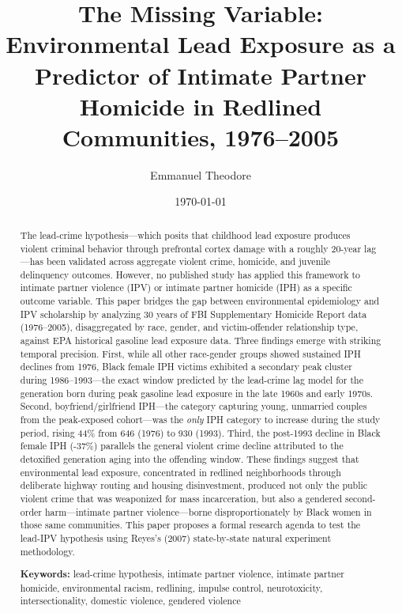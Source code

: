 \documentclass[12pt, letterpaper]{article}
\title{\textbf{The Missing Variable: Environmental Lead Exposure as a Predictor of Intimate Partner Homicide in Redlined Communities, 1976--2005}}
\author{Emmanuel Theodore}
\date{\today}
\begin{document}
\maketitle

\begin{abstract}
The lead-crime hypothesis---which posits that childhood lead exposure produces violent criminal behavior through prefrontal cortex damage with a roughly 20-year lag---has been validated across aggregate violent crime, homicide, and juvenile delinquency outcomes. However, no published study has applied this framework to intimate partner violence (IPV) or intimate partner homicide (IPH) as a specific outcome variable. This paper bridges the gap between environmental epidemiology and IPV scholarship by analyzing 30 years of FBI Supplementary Homicide Report data (1976--2005), disaggregated by race, gender, and victim-offender relationship type, against EPA historical gasoline lead exposure data. Three findings emerge with striking temporal precision. First, while all other race-gender groups showed sustained IPH declines from 1976, Black female IPH victims exhibited a secondary peak cluster during 1986--1993---the exact window predicted by the lead-crime lag model for the generation born during peak gasoline lead exposure in the late 1960s and early 1970s. Second, boyfriend/girlfriend IPH---the category capturing young, unmarried couples from the peak-exposed cohort---was the \textit{only} IPH category to increase during the study period, rising 44\% from 646 (1976) to 930 (1993). Third, the post-1993 decline in Black female IPH (-37\%) parallels the general violent crime decline attributed to the detoxified generation aging into the offending window. These findings suggest that environmental lead exposure, concentrated in redlined neighborhoods through deliberate highway routing and housing disinvestment, produced not only the public violent crime that was weaponized for mass incarceration, but also a gendered second-order harm---intimate partner violence---borne disproportionately by Black women in those same communities. This paper proposes a formal research agenda to test the lead-IPV hypothesis using Reyes's (2007) state-by-state natural experiment methodology.

\vspace{1em}
\noindent\textbf{Keywords:} lead-crime hypothesis, intimate partner violence, intimate partner homicide, environmental racism, redlining, impulse control, neurotoxicity, intersectionality, domestic violence, gendered violence
\end{abstract}
\end{document}
